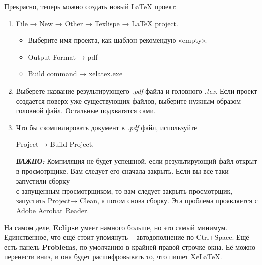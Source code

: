 Прекрасно, теперь можно создать новый \LaTeX{} проект:
\begin{enumerate}
\item File → New → Other → Texlispe → LaTeX project.\par
	\begin{itemize} 
	\item Выберите имя проекта, как шаблон рекомендую «empty».
 	\item Output Format → pdf
 	\item Build command → xelatex.exe
\end{itemize}
\item Выберете название результирующего {\it .pdf} файла и головного {\it .tex}.
Если проект создается поверх уже существующих файлов, выберите нужным образом головной файл. Остальные подхватятся сами.
\item Что бы скомпилировать документ в {\it .pdf} файл, используйте \par
Project → Build Project.
\par {\it \bf ВАЖНО:} Компиляция не будет успешной, если результирующий файл открыт в просмотрщике. Вам следует его сначала закрыть. Если вы
все-таки запустили сборку \\с запущенным просмотрщиком, то вам следует закрыть просмотрщик, запустить Project→ Clean, а потом снова сборку. Эта проблема проявляется с Adobe Acrobat Reader.
\end{enumerate}
На самом деле, {\bf Eclipse} умеет намного больше, но это самый минимум. Единственное, что ещё стоит упомянуть -- автодополнение по 
Ctrl+Space. Ещё есть панель {\bf Problems}, по умолчанию в крайней правой строчке окна. Её можно перенести вниз, и она будет расшифровывать 
то, что пишет Xe\LaTeX{}.

